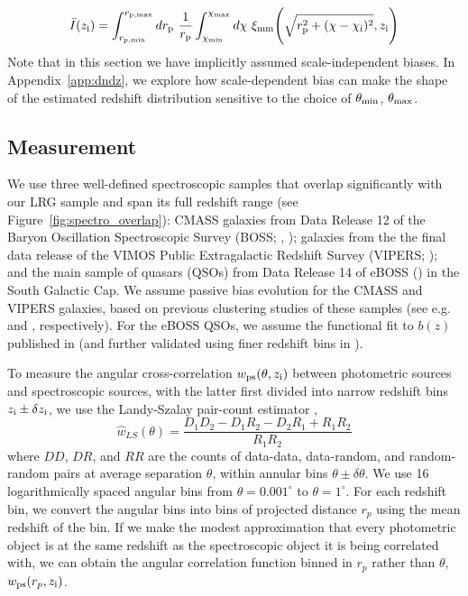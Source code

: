 \documentclass[a4paper,usenatbib]{mnras}
\begin{document}
\begin{equation}\label{Ibar_rp}
    \bar{I}(z_{\rm i}) = \int_{r_{p,\rm min}}^{r_{\rm p, max}}dr_{\rm p} \ \frac{1}{r_{\rm p}} \int_{\chi_{\rm min}}^{\chi_{\rm max}}d\chi \ \xi_{\rm mm}{\Bigg (}\sqrt{r_{\rm p}^2 + (\chi-\chi_{\rm i})^2},z_{\rm i}{\Bigg )}
\end{equation}
Note that in this section we have implicitly assumed scale-independent biases. In Appendix~\ref{app:dndz}, we explore how scale-dependent bias can make the shape of the estimated redshift distribution sensitive to the choice of $\theta_{\rm min}$, $\theta_{\rm max}$.

\subsection{Measurement}

We use three well-defined spectroscopic samples that overlap significantly with our LRG sample and span its full redshift range (see Figure~\ref{fig:spectro_overlap}): CMASS galaxies from Data Release 12 of the Baryon Oscillation Spectroscopic Survey (BOSS; \citealt{Eisenstein11}, \citealt{BOSS13}); galaxies from the the final data release of the VIMOS Public Extragalactic Redshift Survey (VIPERS; \citealt{VIPERS18}); and the main sample of quasars (QSOs) from Data Release 14 of eBOSS (\citealt{Dawson++16}) in the South Galactic Cap. We assume passive bias evolution for the CMASS and VIPERS galaxies, based on previous clustering studies of these samples (see e.g. \citealt{Torres++16} and \citealt{Marulli++13}, respectively). For the eBOSS QSOs, we assume the functional fit to $b(z)$ published in \citealt{Laurent++17} (and further validated using finer redshift bins in \citealt{Krolewski19}).

To measure the angular cross-correlation $w_{\rm ps}(\theta, z_{\rm i})$ between photometric sources and spectroscopic sources, with the latter first divided into narrow redshift bins $z_{\rm i} \pm \delta z_{\rm i}$, we use the Landy-Szalay pair-count estimator \citep{LandySzalay93}, 
%
\begin{equation}\label{eqn:LSestimator}
\hat{w}_{LS}(\theta) = \frac{D_1D_2 - D_1R_2 - D_2R_1 + R_1R_2}{R_1R_2}
\end{equation}
%
where $DD$, $DR$, and $RR$ are the counts of data-data, data-random, and random-random pairs at average separation $\theta$, within annular bins $\theta \pm \delta\theta$. We use 16 logarithmically spaced angular bins from $\theta = 0.001^{\circ}$ to $\theta = 1^{\circ}$. For each redshift bin, we convert the angular bins into bins of projected distance $r_p$ using the mean redshift of the bin. If we make the modest approximation that every photometric object is at the same redshift as the spectroscopic object it is being correlated with, we can obtain the angular correlation function binned in $r_p$ rather than $\theta$, $w_{\rm ps}(r_p, z_{\rm i})$.  
\end{document}
